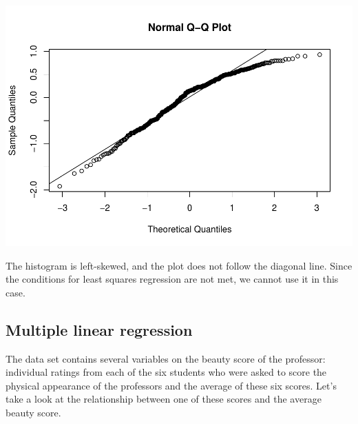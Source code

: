 \documentclass[]{article}
\newenvironment{Shaded}{\begin{snugshade}}{\end{snugshade}}
\newcommand{\KeywordTok}[1]{\textcolor[rgb]{0.13,0.29,0.53}{\textbf{#1}}}
\newcommand{\StringTok}[1]{\textcolor[rgb]{0.31,0.60,0.02}{#1}}
\newcommand{\OperatorTok}[1]{\textcolor[rgb]{0.81,0.36,0.00}{\textbf{#1}}}
\newcommand{\NormalTok}[1]{#1}
\begin{document}
\begin{Shaded}
\end{Shaded}

\includegraphics{multiple_regression_files/figure-latex/quest-6-3.pdf}

The histogram is left-skewed, and the plot does not follow the diagonal
line. Since the conditions for least squares regression are not met, we
cannot use it in this case.

\subsection{Multiple linear
regression}\label{multiple-linear-regression}

The data set contains several variables on the beauty score of the
professor: individual ratings from each of the six students who were
asked to score the physical appearance of the professors and the average
of these six scores. Let's take a look at the relationship between one
of these scores and the average beauty score.

\begin{Shaded}
\end{Shaded}
\end{document}
